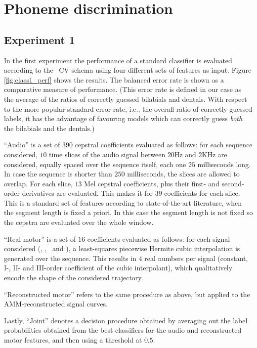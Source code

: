 \section{Phoneme discrimination}
\label{sec:class}

\subsection{Experiment 1}
\label{subsec:exp1}

In the first experiment the performance of a standard classifier is evaluated
according to the \overall\ CV schema using four different sets of features as
input. Figure \ref{fig:class1_perf} shows the results. The balanced error rate
is shown as a comparative measure of performance. (This error rate is defined in
our case as the average of the ratios of correctly guessed bilabials and dentals.
With respect to the more popular standard error rate, i.e., the overall ratio of correctly
guessed labels, it has the advantage of favouring models which can correctly guess
\emph{both} the bilabials and the dentals.)

``Audio'' is a set of $390$ cepstral coefficients evaluated as follows: for each
sequence considered, $10$ time slices of the audio signal between $20$Hz and $2$KHz
are considered, equally spaced over the sequence itself,
each one $25$ milliseconds long. In case the sequence
is shorter than $250$ milliseconds, the slices are allowed to overlap. For each slice,
$13$ Mel cepstral coefficients, plus their first- and second-order derivatives are
evaluated. This makes it for $39$ coefficients for each slice. This is a standard set
of features according to state-of-the-art literature, when the segment
length is fixed a priori. In this case the segment length is not fixed so the
cepstra are evaluated over the whole window.

``Real motor'' is a set of $16$ coefficients evaluated as follows: for each
signal considered (\vlio, \alio, \vttu\ and \attu), a least-squares piecewise
Hermite cubic interpolation is generated over the sequence. This results in $4$ real
numbers per signal (constant, I-, II- and III-order coefficient of the cubic
interpolant), which qualitatively encode the shape of the considered trajectory.

``Reconstructed motor'' refers to the same procedure as above, but applied
to the AMM-reconstructed signal curves.

Lastly, ``Joint'' denotes a decision procedure obtained by averaging out the
label probabilities obtained from the best classifiers for the audio and
reconstructed motor features, and then using a threshold at $0.5$.

